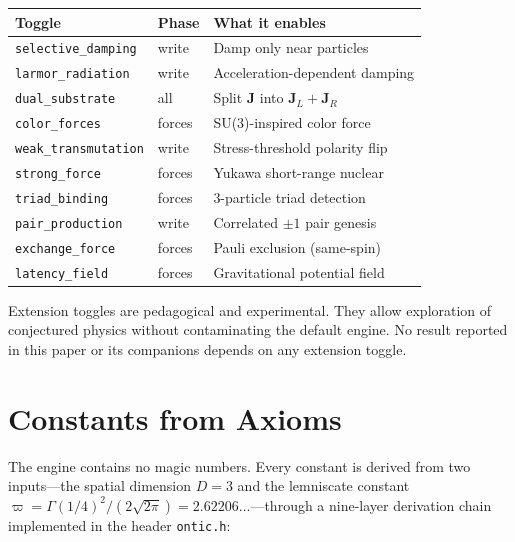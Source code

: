 \documentclass[11pt,a4paper]{article}
\newcommand{\vpi}{\varpi}
\theoremstyle{compact}
\begin{document}
\begin{center}
\small
\begin{tabular}{lll}
\toprule
\textbf{Toggle} & \textbf{Phase} & \textbf{What it enables} \\
\midrule
\texttt{selective\_damping} & write & Damp only near particles \\
\texttt{larmor\_radiation} & write & Acceleration-dependent damping \\
\texttt{dual\_substrate} & all & Split $\mathbf{J}$ into $\mathbf{J}_L + \mathbf{J}_R$ \\
\texttt{color\_forces} & forces & SU(3)-inspired color force \\
\texttt{weak\_transmutation} & write & Stress-threshold polarity flip \\
\texttt{strong\_force} & forces & Yukawa short-range nuclear \\
\texttt{triad\_binding} & forces & 3-particle triad detection \\
\texttt{pair\_production} & write & Correlated $\pm 1$ pair genesis \\
\texttt{exchange\_force} & forces & Pauli exclusion (same-spin) \\
\texttt{latency\_field} & forces & Gravitational potential field \\
\bottomrule
\end{tabular}
\end{center}

Extension toggles are pedagogical and experimental. They allow exploration of conjectured physics without contaminating the default engine. No result reported in this paper or its companions depends on any extension toggle.


\section{Constants from Axioms}
\label{sec:constants}

The engine contains no magic numbers. Every constant is derived from two inputs---the spatial dimension $D = 3$ and the lemniscate constant $\vpi = \Gamma(1/4)^2/(2\sqrt{2\pi}) = 2.62206\ldots$---through a nine-layer derivation chain implemented in the header \texttt{ontic.h}:
\end{document}
